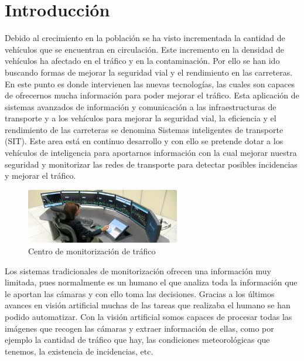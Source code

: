 \chapter{Introducción}\label{cap.introduccion}

Debido al crecimiento en la población se ha visto incrementada la cantidad de vehículos que se encuentran en circulación. Este incremento en la densidad de vehículos ha afectado en el tráfico y en la contaminación. Por ello se han ido buscando formas de mejorar la seguridad vial y el rendimiento en las carreteras. En este punto es donde intervienen las nuevas tecnologías, las cuales son capaces de ofrecernos mucha información para poder mejorar el tráfico. Esta aplicación de sistemas avanzados de información y comunicación a las infraestructuras de transporte y a los vehículos para mejorar la seguridad vial, la eficiencia y el rendimiento de las carreteras se denomina Sistemas inteligentes de transporte (SIT). Este area está en continuo desarrollo y con ello se pretende dotar a los vehículos de inteligencia para aportarnos información con la cual mejorar nuestra seguridad y monitorizar las redes de transporte para detectar posibles incidencias y mejorar el tráfico.


\begin{figure}[H]
  \begin{center}
    \includegraphics[width=0.6\textwidth]{figures/Introduccion/Indra.jpg}
		\caption{Centro de monitorización de tráfico}
		\label{fig.monitorizacion}
		\end{center}
\end{figure}

Los sistemas tradicionales de monitorización ofrecen una información muy limitada, pues normalmente es un humano el que analiza toda la información que le aportan las cámaras y con ello toma las decisiones. Gracias a los últimos avances en visión artificial muchas de las tareas que realizaba el humano se han podido automatizar. Con la visión artificial somos capaces de procesar todas las imágenes que recogen las cámaras y extraer información de ellas, como por ejemplo la cantidad de tráfico que hay, las condiciones meteorológicas que tenemos, la existencia de incidencias, etc.

